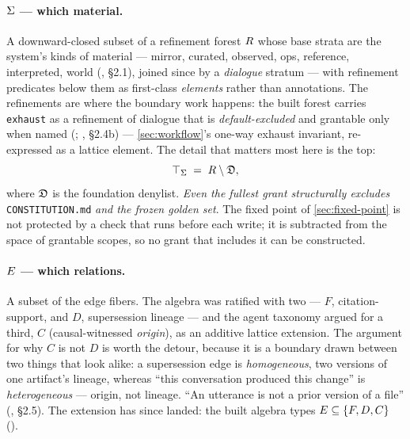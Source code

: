 \paragraph{$\Sigma{}$ --- which material.} A downward-closed subset of a
refinement forest $R{}$ whose base strata are the system's kinds of material
--- mirror, curated, observed, ops, reference, interpreted, world
(, \S 2.1), joined since by a \emph{dialogue}
stratum --- with refinement predicates below them as first-class \emph{elements}
rather than annotations. The refinements are where the boundary work happens: the
built forest carries \texttt{exhaust} as a refinement of dialogue that is
\emph{default-excluded} and grantable only when named
(;
, \S 2.4b) --- \autoref{sec:workflow}'s one-way exhaust
invariant, re-expressed as a lattice element. The detail that matters most here is
the top:
\[
  \top_{\Sigma{}} \;=\; R{} \setminus \mathfrak{D}{},
\]
where $\mathfrak{D}{}$ is the foundation denylist. \emph{Even the fullest grant
structurally excludes} \texttt{CONSTITUTION.md} \emph{and the frozen golden set}.
The fixed point of \autoref{sec:fixed-point} is not protected by a check that runs
before each write; it is subtracted from the space of grantable scopes, so no
grant that includes it can be constructed.

\paragraph{$E{}$ --- which relations.} A subset of the edge fibers.
The algebra was ratified with two --- $F$, citation-support, and $D$, supersession
lineage --- and the agent taxonomy argued for a third, $C$ (causal-witnessed
\emph{origin}), as an additive lattice extension. The argument for why $C$ is not
$D$ is worth the detour, because it is a boundary drawn between two things that look
alike: a supersession edge is \emph{homogeneous}, two versions of one artifact's
lineage, whereas ``this conversation produced this change'' is
\emph{heterogeneous} --- origin, not lineage. ``An utterance is not a prior version
of a file'' (, \S 2.5). The extension has since landed:
the built algebra types $E{} \subseteq \{F, D, C\}$
().

